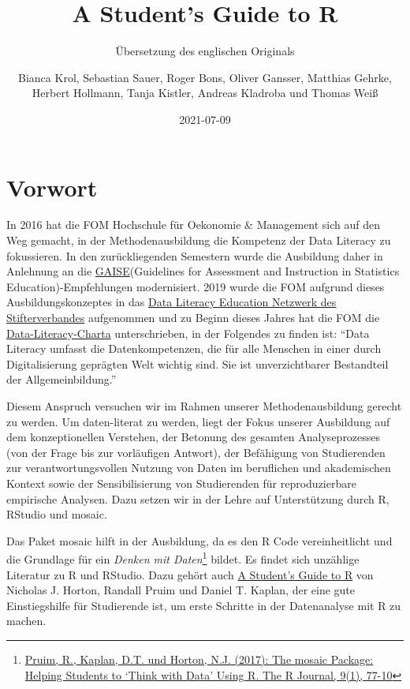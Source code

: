 \documentclass[
  ngerman,
]{scrbook}
\title{A Student's Guide to R}
\subtitle{Übersetzung des englischen Originals}
\author{Bianca Krol, Sebastian Sauer, Roger Bons, Oliver Gansser, Matthias Gehrke, Herbert Hollmann, Tanja Kistler, Andreas Kladroba und Thomas Weiß}
\date{2021-07-09}
\begin{document}
\maketitle

{
\hypersetup{linkcolor=}
\setcounter{tocdepth}{1}
\tableofcontents
}
\hypertarget{vorwort}{%
\chapter*{Vorwort}\label{vorwort}}

In 2016 hat die FOM Hochschule für Oekonomie \& Management sich auf den Weg gemacht, in der Methodenausbildung die Kompetenz der Data Literacy zu fokussieren. In den zurückliegenden Semestern wurde die Ausbildung daher in Anlehnung an die \href{https://www.amstat.org/asa/files/pdfs/GAISE/GaiseCollege_Full.pdf}{GAISE}(Guidelines for Assessment and Instruction in Statistics Education)-Empfehlungen modernisiert. 2019 wurde die FOM aufgrund dieses Ausbildungskonzeptes in das \href{https://www.stifterverband.org/data-literacy-education}{Data Literacy Education Netzwerk des Stifterverbandes} aufgenommen und zu Beginn dieses Jahres hat die FOM die \href{https://www.stifterverband.org/charta-data-literacy}{Data-Literacy-Charta} unterschrieben, in der Folgendes zu finden ist: ``Data Literacy umfasst die Datenkompetenzen, die für alle Menschen in einer durch Digitalisierung geprägten Welt wichtig sind. Sie ist unverzichtbarer Bestandteil der Allgemeinbildung.''

Diesem Anspruch versuchen wir im Rahmen unserer Methodenausbildung gerecht zu werden. Um daten-literat zu werden, liegt der Fokus unserer Ausbildung auf dem konzeptionellen Verstehen, der Betonung des gesamten Analyseprozesses (von der Frage bis zur vorläufigen Antwort), der Befähigung von Studierenden zur verantwortungsvollen Nutzung von Daten im beruflichen und akademischen Kontext sowie der Sensibilisierung von Studierenden für reproduzierbare empirische Analysen. Dazu setzen wir in der Lehre auf Unterstützung durch R, RStudio und mosaic.

Das Paket mosaic hilft in der Ausbildung, da es den R Code vereinheitlicht und die Grundlage für ein \emph{Denken mit Daten}\footnote{\href{https://journal.r-project.org/archive/2017/RJ-2017-024/index.html}{Pruim, R., Kaplan, D.T. und Horton, N.J. (2017): The mosaic Package: Helping Students to `Think with Data' Using R. The R Journal, 9(1), 77-10}} bildet. Es findet sich unzählige Literatur zu R und RStudio. Dazu gehört auch \href{https://github.com/ProjectMOSAIC/LittleBooks/raw/master/StudentGuide/MOSAIC-StudentGuide.pdf}{A Student's Guide to R} von Nicholas J. Horton, Randall Pruim und Daniel T. Kaplan, der eine gute Einstiegshilfe für Studierende ist, um erste Schritte in der Datenanalyse mit R zu machen.
\end{document}
